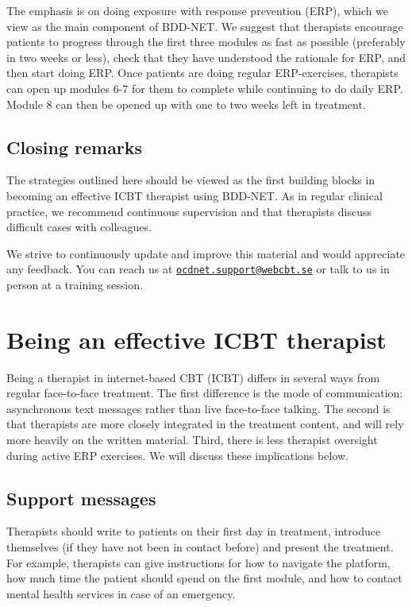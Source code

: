 \documentclass[]{book}
\theoremstyle{definition}
\theoremstyle{definition}
\theoremstyle{definition}
\theoremstyle{remark}
\begin{document}
The emphasis is on doing exposure with response prevention (ERP), which
we view as the main component of BDD-NET. We suggest that therapists
encourage patients to progress through the first three modules as fast
as possible (preferably in two weeks or less), check that they have
understood the rationale for ERP, and then start doing ERP. Once
patients are doing regular ERP-exercises, therapists can open up modules
6-7 for them to complete while continuing to do daily ERP. Module 8 can
then be opened up with one to two weeks left in treatment.

\hypertarget{closing-remarks-1}{%
\section{Closing remarks}\label{closing-remarks-1}}

The strategies outlined here should be viewed as the first building
blocks in becoming an effective ICBT therapist using BDD-NET. As in
regular clinical practice, we recommend continuous supervision and that
therapists discuss difficult cases with colleagues.

We strive to continuously update and improve this material and would
appreciate any feedback. You can reach us at
\href{mailto:ocdnet.support@webcbt.se}{\nolinkurl{ocdnet.support@webcbt.se}}
or talk to us in person at a training session.

\hypertarget{being-an-effective-icbt-therapist}{%
\chapter{Being an effective ICBT
therapist}\label{being-an-effective-icbt-therapist}}

Being a therapist in internet-based CBT (ICBT) differs in several ways
from regular face-to-face treatment. The first difference is the mode of
communication: asynchronous text messages rather than live face-to-face
talking. The second is that therapists are more closely integrated in
the treatment content, and will rely more heavily on the written
material. Third, there is less therapist oversight during active ERP
exercises. We will discuss these implications below.

\hypertarget{support-messages}{%
\section{Support messages}\label{support-messages}}

Therapists should write to patients on their first day in treatment,
introduce themselves (if they have not been in contact before) and
present the treatment. For example, therapists can give instructions for
how to navigate the platform, how much time the patient should spend on
the first module, and how to contact mental health services in case of
an emergency.
\end{document}
